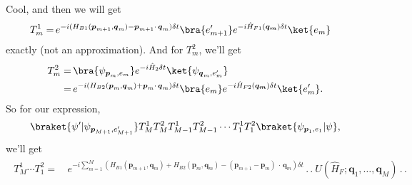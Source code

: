\documentclass{report}
\begin{document}
Cool, and then we will get 
\begin{align}
\begin{aligned}
	T^1_{m} =&\,
		e^{-i  (H_{B1}(\boldsymbol{p}_{m+1}, \boldsymbol{q}_{m}) 
			- \boldsymbol{p}_{m+1} \cdot\, \boldsymbol{q}_m) \delta t} 
		\bra{e_{m+1}'}
			e^{-i  \hat H_{F1}(\boldsymbol{q_m}) \delta t} 
		\ket{e_{m}} 
\end{aligned}
\end{align}
exactly (not an approximation). And for $T^2_m$, we'll get
\begin{align}
\begin{aligned}
	T^2_{m} =&\,
		\bra{\psi_{\boldsymbol{p}_{m}, e_{m}}}
			e^{-i  \hat H_{2} \delta t}
		\ket{\psi_{\boldsymbol{q}_{m}, e_{m}'}} 
	\\=&\,
		e^{-i  (H_{B2}(\boldsymbol{p}_{m}, \boldsymbol{q}_{m}) 
			+ \boldsymbol{p}_{m} \cdot\, \boldsymbol{q}_m) \delta t} 
		\bra{e_{m}}
			e^{-i  \hat H_{F2}(\boldsymbol{q_m}) \delta t} 
		\ket{e_{m}'}.
	\label{T2_m_01}
\end{aligned}
\end{align}
So for our expression,
\begin{align}
\begin{aligned}
	\braket{\psi' | \psi_{\boldsymbol{p}_{M+1}, e_{M+1}'}} 
			T^1_{M}T^2_{M} T^1_{M-1}T^2_{M-1} \cdots T^1_{1}T^2_{1}
		\braket{\psi_{\boldsymbol{p}_{1}, e_{1}} | \psi},
\end{aligned}
\end{align} 
we'll get
\begin{align}
\begin{aligned}
	T^1_{M} \cdots T^2_{1} 
	=&\,
		e^{-i  
			\sum_{m=1}^{M} (
				H_{B1}(\boldsymbol{p}_{m+1}, \boldsymbol{q}_{m}) + 
				H_{B2}(\boldsymbol{p}_{m}, \boldsymbol{q}_{m}) -
				(\boldsymbol{p}_{m+1} - \boldsymbol{p}_{m}) \,\cdot\, \boldsymbol{q}_m 
			) \delta t
		} \,.\,.\ U(\hat H_{F}; \boldsymbol{q}_1, \ldots, \boldsymbol{q}_M)\,.\,.
\end{aligned}
\end{align} 
\end{document}
